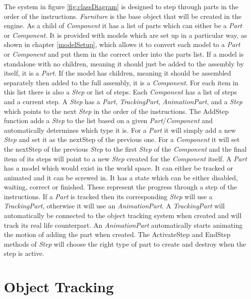 \documentclass{l4proj}
\begin{document}
The system in figure \ref{fig:classDiagram} is designed to step through parts in the order of the instructions. \textit{Furniture} is the base object that will be created in the engine. As a child of \textit{Component} it has a list of parts which can either be a \textit{Part} or \textit{Component}. It is provided with models which are set up in a particular way, as shown in chapter \ref{modelSetup}, which allows it to convert each model to a \textit{Part} or \textit{Component} and put them in the correct order into the parts list. If a model is standalone with no children, meaning it should just be added to the assembly by itself, it is a \textit{Part}. If the model has children, meaning it should be assembled separately then added to the full assembly, it is a \textit{Component}. For each item in this list there is also a \textit{Step} or list of steps. Each \textit{Component} has a list of steps and a current step. A \textit{Step} has a \textit{Part}, \textit{TrackingPart}, \textit{AnimationPart}, and a \textit{Step} which points to the next \textit{Step} in the order of the instructions. The AddStep function adds a \textit{Step} to the list based on a given \textit{Part}/\textit{Component} and automatically determines which type it is. For a \textit{Part} it will simply add a new \textit{Step} and set it as the nextStep of the previous one. For a \textit{Component} it will set the nextStep of the previous \textit{Step} to the first \textit{Step} of the \textit{Component} and the final item of its steps will point to a new \textit{Step} created for the \textit{Component} itself. A \textit{Part} has a model which would exist in the world space. It can either be tracked or animated and it can be screwed in. It has a state which can be either disabled, waiting, correct or finished. These represent the progress through a step of the instructions. If a \textit{Part} is tracked then its corresponding \textit{Step} will use a \textit{TrackingPart}, otherwise it will use an \textit{AnimationPart}. A \textit{TrackingPart} will automatically be connected to the object tracking system when created and will track its real life counterpart. An \textit{AnimationPart} automatically starts animating the motion of adding the part when created. The ActivateStep and EndStep methods of \textit{Step} will choose the right type of part to create and destroy when the step is active.

\section{Object Tracking}
\end{document}
